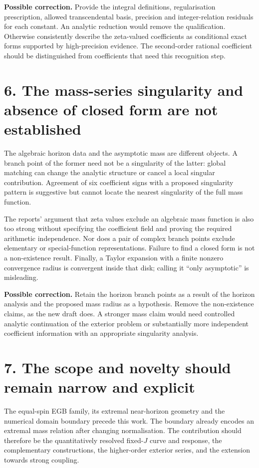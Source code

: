 \documentclass[11pt,a4paper]{article}
\begin{document}
\textbf{Possible correction.} Provide the integral definitions, regularisation prescription, allowed transcendental basis, precision and integer-relation residuals for each constant. An analytic reduction would remove the qualification. Otherwise consistently describe the zeta-valued coefficients as conditional exact forms supported by high-precision evidence. The second-order rational coefficient should be distinguished from coefficients that need this recognition step.

\section*{6. The mass-series singularity and absence of closed form are not established}
The algebraic horizon data and the asymptotic mass are different objects. A branch point of the former need not be a singularity of the latter: global matching can change the analytic structure or cancel a local singular contribution. Agreement of six coefficient signs with a proposed singularity pattern is suggestive but cannot locate the nearest singularity of the full mass function.

The reports' argument that zeta values exclude an algebraic mass function is also too strong without specifying the coefficient field and proving the required arithmetic independence. Nor does a pair of complex branch points exclude elementary or special-function representations. Failure to find a closed form is not a non-existence result. Finally, a Taylor expansion with a finite nonzero convergence radius is convergent inside that disk; calling it ``only asymptotic'' is misleading.

\textbf{Possible correction.} Retain the horizon branch points as a result of the horizon analysis and the proposed mass radius as a hypothesis. Remove the non-existence claims, as the new draft does. A stronger mass claim would need controlled analytic continuation of the exterior problem or substantially more independent coefficient information with an appropriate singularity analysis.

\section*{7. The scope and novelty should remain narrow and explicit}
The equal-spin EGB family, its extremal near-horizon geometry and the numerical domain boundary precede this work. The boundary already encodes an extremal mass relation after changing normalisation. The contribution should therefore be the quantitatively resolved fixed-$J$ curve and response, the complementary constructions, the higher-order exterior series, and the extension towards strong coupling.
\end{document}
